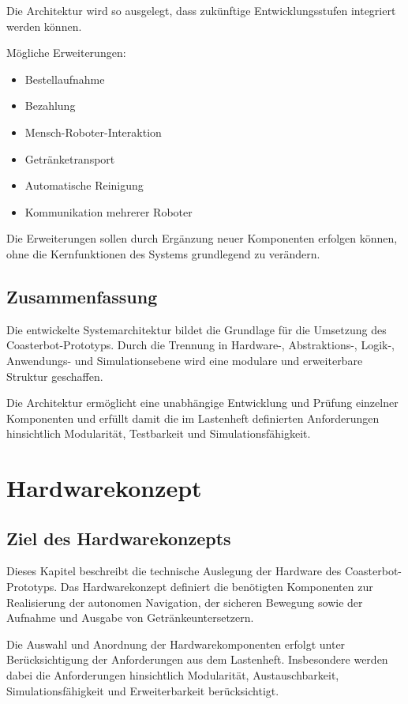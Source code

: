 \documentclass[
  a4paper,
  12pt,
  DIV=12,        %
  parskip=half,  %
  headings=small %
]{scrartcl}
\theoremstyle{definition}
\providecommand{\tightlist}{%
  \setlength{\itemsep}{0pt}\setlength{\parskip}{0pt}}
\theoremstyle{definition}
\begin{document}
Die Architektur wird so ausgelegt, dass zukünftige Entwicklungsstufen
integriert werden können.

Mögliche Erweiterungen:

\begin{itemize}
\tightlist
\item
  Bestellaufnahme
\item
  Bezahlung
\item
  Mensch-Roboter-Interaktion
\item
  Getränketransport
\item
  Automatische Reinigung
\item
  Kommunikation mehrerer Roboter
\end{itemize}

Die Erweiterungen sollen durch Ergänzung neuer Komponenten erfolgen
können, ohne die Kernfunktionen des Systems grundlegend zu verändern.

\subsection{Zusammenfassung}\label{zusammenfassung}

Die entwickelte Systemarchitektur bildet die Grundlage für die Umsetzung
des Coasterbot-Prototyps. Durch die Trennung in Hardware-,
Abstraktions-, Logik-, Anwendungs- und Simulationsebene wird eine
modulare und erweiterbare Struktur geschaffen.

Die Architektur ermöglicht eine unabhängige Entwicklung und Prüfung
einzelner Komponenten und erfüllt damit die im Lastenheft definierten
Anforderungen hinsichtlich Modularität, Testbarkeit und
Simulationsfähigkeit.

\section{Hardwarekonzept}\label{hardwarekonzept}

\subsection{Ziel des Hardwarekonzepts}\label{ziel-des-hardwarekonzepts}

Dieses Kapitel beschreibt die technische Auslegung der Hardware des
Coasterbot-Prototyps. Das Hardwarekonzept definiert die benötigten
Komponenten zur Realisierung der autonomen Navigation, der sicheren
Bewegung sowie der Aufnahme und Ausgabe von Getränkeuntersetzern.

Die Auswahl und Anordnung der Hardwarekomponenten erfolgt unter
Berücksichtigung der Anforderungen aus dem Lastenheft. Insbesondere
werden dabei die Anforderungen hinsichtlich Modularität,
Austauschbarkeit, Simulationsfähigkeit und Erweiterbarkeit
berücksichtigt.
\end{document}
